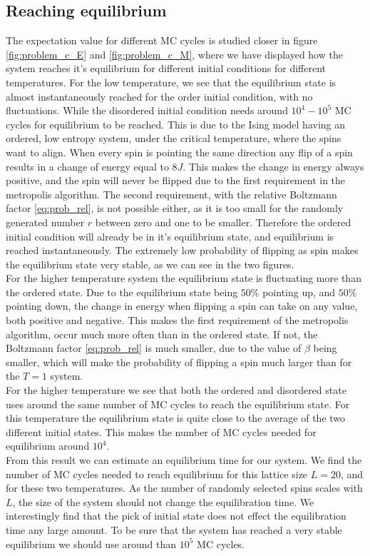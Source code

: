 \documentclass[%
 reprint,
nofootinbib,
aps,
]{revtex4-1}
\begin{document}
\subsection{Reaching equilibrium}
The expectation value for different MC cycles is studied closer in figure \ref{fig:problem_c_E} and \vref{fig:problem_c_M}, where we have displayed how the system reaches it's equilibrium for different initial conditions for different temperatures.
For the low temperature, we see that the equilibrium state is almost instantaneously reached for the order initial condition, with no fluctuations. While the disordered initial condition needs around $10^4-10^5$ MC cycles for equilibrium to be reached. This is due to the Ising model having an ordered, low entropy system, under the critical temperature, where the spins want to align. When every spin is pointing the same direction any flip of a spin results in a change of energy equal to  $8J$. This makes the change in energy always positive, and the spin will never be flipped due to the first requirement in the metropolis algorithm. The second requirement, with the relative Boltzmann factor \eqref{eq:prob_rel}, is not possible either, as it is too small for the randomly generated number $r$ between zero and one to be smaller. Therefore the ordered initial condition will already be in it's equilibrium state, and equilibrium is reached instantaneously. The extremely low probability of flipping as spin makes the equilibrium state very stable, as we can see in the two figures. \\
For the higher temperature system the equilibrium state is fluctuating more than the ordered state. Due to the equilibrium state being $50\%$ pointing up, and $50\%$ pointing down, the change in energy when flipping a spin can take on any value, both positive and negative. This makes the first requirement of the metropolis algorithm, occur much more often than in the ordered state. If not, the Boltzmann factor \eqref{eq:prob_rel} is much smaller, due to the value of $\beta$ being smaller, which will make the probability of flipping a spin much larger than for the $T=1$ system.\\
For the higher temperature we see that both the ordered and disordered state uses around the same number of MC cycles to reach the equilibrium state. For this temperature the equilibrium state is quite close to the average of the two different initial states. This makes the number of MC cycles needed for equilibrium around $10^4$.\\
From this result we can estimate an equilibrium time for our system. We find the number of MC cycles needed to reach equilibrium for this lattice size $L=20$, and for these two temperatures. As the number of randomly selected spins scales with $L$, the size of the system should not change the equilibration time. We interestingly find that the pick of initial state does not effect the equilibration time any large amount. To be sure that the system has reached a very stable equilibrium we should use around than $10^5$ MC cycles.\\
\end{document}
